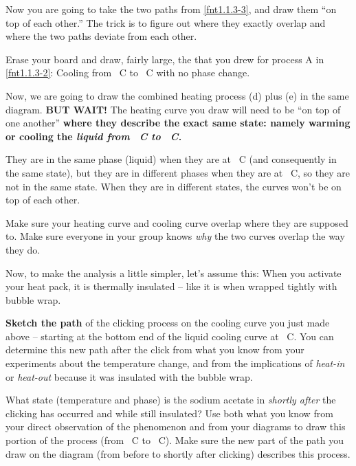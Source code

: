 \begin{benumerate}

	
	Now you are going to take the two paths from \ref{fnt1.1.3-3}, and draw them ``on top of each other.'' The trick is to figure out where they exactly overlap and where the two paths deviate from each other.
	
	Erase your board and draw, fairly large, the \TempGraph{} that you drew for process A in \ref{fnt1.1.3-2}: Cooling from \unit[100]{\textdegree C} to \unit[23]{\textdegree C} with no phase change.
	
	Now, we are going to draw the combined heating process (d) plus (e) in the same diagram. \textbf{BUT WAIT!} The heating curve you draw will need to be ``on top of one another'' \textbf{where they describe the exact same state: namely warming or cooling the {\em liquid from \unit[54]{\textdegree C} to \unit[100]{\textdegree C}.}}
	
	They are in the same phase (liquid) when they are at \unit[100]{\textdegree C} (and consequently in the same state), but they are in different phases when they are at \unit[23]{\textdegree C}, so they are not in the same state. When they are in different states, the curves won't be on top of each other.
	
	Make sure your heating curve and cooling curve overlap where they are supposed to. Make sure everyone in your group knows {\em why} the two curves overlap the way they do.

\WCD

	
	Now, to make the analysis a little simpler, let's assume this: When you activate your heat pack, it is thermally insulated -- like it is when wrapped tightly with bubble wrap.
	
	\textbf{Sketch the path} of the clicking process on the cooling curve you just made above -- starting at the bottom end of the liquid cooling curve at \unit[23]{\textdegree C}. You can determine this new path after the click from what you know from your experiments about the temperature change, and from the implications of {\em heat-in} or {\em heat-out} because it was insulated with the bubble wrap.
	
	What state (temperature and phase) is the sodium acetate in {\em shortly after} the clicking has occurred and while still insulated? Use both what you know from your direct observation of the phenomenon and from your diagrams to draw this portion of the process (from \unit[23]{\textdegree C} to \unit[54]{\textdegree C}). Make sure the new part of the path you draw on the diagram (from before to shortly after clicking) describes this process.
	

\end{benumerate}
